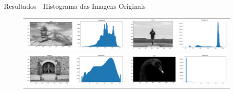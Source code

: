 \documentclass[]{beamer}
\begin{document}
\begin{frame}{Resultados - Histograma das Imagens Originais}
\begin{figure}
    \begin{tabular}{cc}
         \includegraphics[scale=0.15]{Imagens/resultados-histograma-cairn.png} &   
         \includegraphics[scale=0.15]{Imagens/resultados-histograma-runner.png} \\
         \includegraphics[scale=0.15]{Imagens/resultados-histograma-shutters.png} &   
         \includegraphics[scale=0.15]{Imagens/resultados-histograma-swan.png} \\
    \end{tabular}
\end{figure}
\end{frame}
\end{document}
